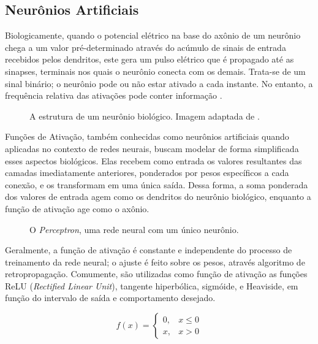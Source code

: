 \subsection{Neurônios Artificiais}

Biologicamente, quando o potencial elétrico na base do axônio de um neurônio chega a um valor pré-determinado através do acúmulo de sinais de entrada recebidos pelos dendritos, este gera um pulso elétrico que é propagado até as sinapses, terminais nos quais o neurônio conecta com os demais.
Trata-se de um sinal binário; o neurônio pode ou não estar ativado a cada instante. No entanto, a frequência relativa das ativações pode conter informação \cite{behnkeHierarchicalNeuralNetworks2003}.

\begin{figure}[H]
    \centering
    
    \caption{A estrutura de um neurônio biológico. Imagem adaptada de \cite{dhp1080IdoSkemoPri2016}.}
    \label{fig:bio_neuron}
\end{figure}

Funções de Ativação, também conhecidas como neurônios artificiais quando aplicadas no contexto de redes neurais, buscam modelar de forma simplificada esses aspectos biológicos.
Elas recebem como entrada os valores resultantes das camadas imediatamente anteriores, ponderados por pesos específicos a cada conexão, e os transformam em uma única saída.
Dessa forma, a soma ponderada dos valores de entrada agem como os dendritos do neurônio biológico, enquanto a função de ativação age como o axônio.

\begin{figure}[ht]
    \centering
    
    \caption{O \textit{Perceptron}, uma rede neural com um único neurônio.}
    \label{fig:perceptron}
\end{figure}

Geralmente, a função de ativação é constante e independente do processo de treinamento da rede neural; o ajuste é feito sobre os pesos, através algoritmo de retropropagação.
Comumente, são utilizadas como função de ativação as funções ReLU (\textit{Rectified Linear Unit}), tangente hiperbólica, sigmóide, e Heaviside, em função do intervalo de saída e comportamento desejado.

\begin{equation}\label{eq:relu}
    f(x) = \left\{
        \begin{array}{ll}
            0, & x \le 0\\
            x, & x > 0
        \end{array}
    \right.
\end{equation}

